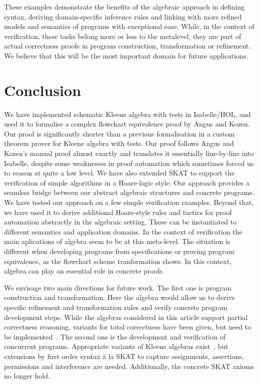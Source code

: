 \documentclass{llncs}
\begin{document}
These examples demonstrate the benefits of the algebraic approach in
defining syntax, deriving domain-specific inference rules and linking
with more refined models and semantics of programs with exceptional
ease. While, in the context of verification, these tasks belong more
or less to the metalevel, they are part of actual correctness proofs
in program construction, transformation or refinement. We believe that
this will be the most important domain for future applications.


\section{Conclusion}

We have implemented schematic Kleene algebra with tests in
Isabelle/HOL, and used it to formalise a complex flowchart equivalence
proof by Angus and Kozen. Our proof is significantly shorter than a
previous formalisation in a custom theorem prover for Kleene algebra
with tests. Our proof follows Angus and Kozen's manual proof almost
exactly and translates it essentially line-by-line into Isabelle,
despite some weaknesses in proof automation which sometimes forced us
to reason at quite a low level. We have also extended SKAT to support
the verification of simple algorithms in a Hoare-logic style. Our
approach provides a seamless bridge between our abstract algebraic
structures and concrete programs. We have tested our approach on a few
simple verification examples. Beyond that, we have used it to derive
additional Hoare-style rules and tactics for proof automation
abstractly in the algebraic setting. These can be instantiated to
different semantics and application domains. In the context of
verification the main aplications of algebra seem to be at this
meta-level. The situation is different when developing programs from
specifications or proving program equivalence, as the flowchart scheme
tranformation shows. In this context, algebra can play an essential
role in concrete proofs.

We envisage two main directions for future work. The first one is
program construction and transformation. Here the algebra would allow
us to derive specific refinement and transformation rules and verify
concrete program development steps.  While the algebras considered in
this article support partial correctness reasoning, variants for total
correctness have been given, but need to be
implemented~\cite{vonWright,Guttmann}. The second one is the
development and verification of concurrent programs. Appropriate
variants of Kleene algebras exist~\cite{HoareCKA}, but extensions by
first order syntax \`a la SKAT to capture assignments, assertions,
permissions and interference are needed. Additionally, the concrete
SKAT axioms no longer hold.
\end{document}
